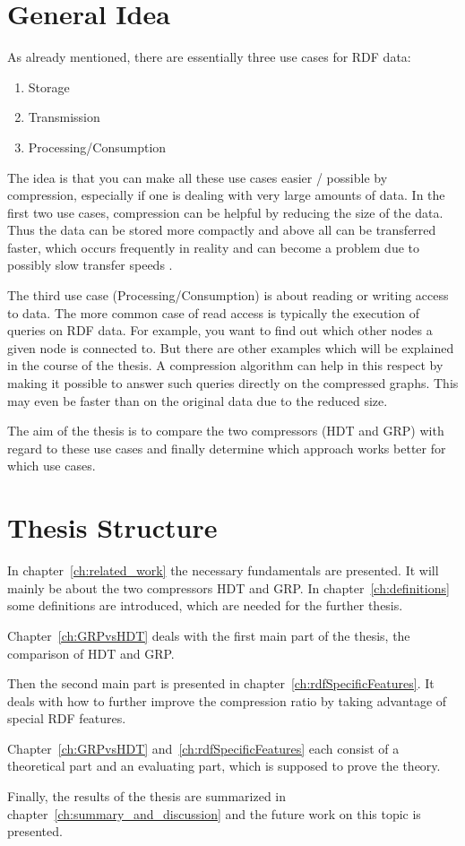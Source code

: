\section{General Idea}

As already mentioned, there are essentially three use cases for RDF data:

\begin{enumerate}
	\item Storage
	\item Transmission
	\item Processing/Consumption
\end{enumerate}

The idea is that you can make all these use cases easier / possible by compression, especially if one is dealing with very large amounts of data. In the first two use cases, compression can be helpful by reducing the size of the data. Thus the data can be stored more compactly and above all can be transferred faster, which occurs frequently in reality and can become a problem due to possibly slow transfer speeds .

The third use case (Processing/Consumption) is about reading or writing access to data. The more common case of read access is typically the execution of queries on RDF data. For example, you want to find out which other nodes a given node is connected to. But there are other examples which will be explained in the course of the thesis. A compression algorithm can help in this respect by making it possible to answer such queries directly on the compressed graphs. This may even be faster than on the original data due to the reduced size.

The aim of the thesis is to compare the two compressors (HDT and GRP) with regard to these use cases and finally determine which approach works better for which use cases.



\section{Thesis Structure}

In chapter~\ref{ch:related_work} the necessary fundamentals are presented. It will mainly be about the two compressors HDT and GRP. In chapter~\ref{ch:definitions} some definitions are introduced, which are needed for the further thesis. 

Chapter~\ref{ch:GRPvsHDT} deals with the first main part of the thesis, the comparison of HDT and GRP. 

Then the second main part is presented in chapter~\ref{ch:rdfSpecificFeatures}. It deals with how to further improve the compression ratio by taking advantage of special RDF features. 

Chapter~\ref{ch:GRPvsHDT} and~\ref{ch:rdfSpecificFeatures} each consist of a theoretical part and an evaluating part, which is supposed to prove the theory.

Finally, the results of the thesis are summarized in chapter~\ref{ch:summary_and_discussion} and the future work on this topic is presented.








